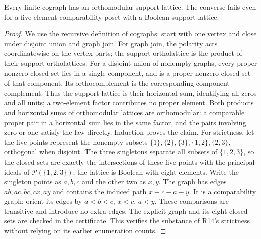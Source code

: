 \begin{proposition}
\label{SA21-A25}
Every finite cograph has an orthomodular support lattice. The converse
fails even for a five-element comparability poset with a Boolean
support lattice.
\end{proposition}
\begin{proof}
We use the recursive definition of cographs: start with one vertex
and close under disjoint union and graph join. For graph join, the
polarity acts coordinatewise on the vertex parts; the support
ortholattice is the product of their support ortholattices. For a
disjoint union of nonempty graphs, every proper nonzero closed set
lies in a single component, and is a proper nonzero closed set of
that component. Its orthocomplement is the corresponding component
complement. Thus the support lattice is their horizontal sum,
identifying all zeros and all units; a two-element factor contributes
no proper element. Both products and horizontal sums of
orthomodular lattices are orthomodular: a comparable proper pair in
a horizontal sum lies in the same factor, and the pairs involving
zero or one satisfy the law directly. Induction proves the claim.
For strictness, let the five points represent the nonempty subsets
$\{1\},\{2\},\{3\},\{1,2\},\{2,3\}$, orthogonal when disjoint.
The three singletons separate all subsets of $\{1,2,3\}$, so the
closed sets are exactly the intersections of these five points with
the principal ideals of $\mathscr P(\{1,2,3\})$; the lattice is
Boolean with eight elements. Write the singleton points as $a,b,c$
and the other two as $x,y$. The graph has edges $ab,ac,bc,cx,ay$ and
contains the induced path $x-c-a-y$. It is a comparability graph:
orient its edges by $a<b<c$, $x<c$, $a<y$. These comparisons are
transitive and introduce no extra edges. The explicit graph and its
eight closed sets are checked in the certificate. This verifies the
substance of R14's strictness without relying on its earlier
enumeration counts.
\end{proof}
